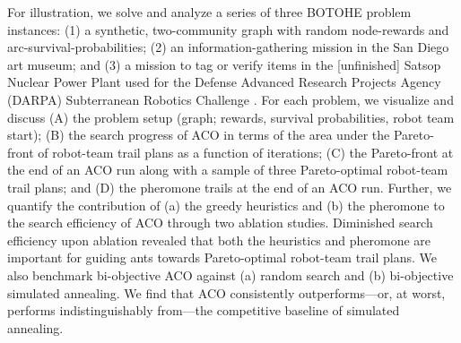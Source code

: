 \documentclass[fleqn,10pt,lineno]{wlpeerj}
\begin{document}
For illustration, we solve and analyze a series of three BOTOHE problem instances:
(1) a synthetic, two-community graph with random node-rewards and arc-survival-probabilities;
(2) an information-gathering mission in the San Diego art museum;
and
(3) a mission to tag or verify items in the [unfinished] Satsop Nuclear Power Plant used for the Defense Advanced Research Projects Agency (DARPA) Subterranean Robotics Challenge \cite{ackerman2022robots,orekhov2022darpa}.
For each problem, we visualize and discuss
(A) the problem setup (graph; rewards, survival probabilities, robot team start); 
(B) the search progress of ACO in terms of the area under the Pareto-front of robot-team trail plans as a function of iterations;
(C) the Pareto-front at the end of an ACO run along with a sample of three Pareto-optimal robot-team trail plans; and
(D) the pheromone trails at the end of an ACO run.
Further, we quantify the contribution of (a) the greedy heuristics and (b) the pheromone to the search efficiency of ACO through two ablation studies. Diminished search efficiency upon ablation revealed that both the heuristics and pheromone are important for guiding ants towards Pareto-optimal robot-team trail plans.
We also benchmark bi-objective ACO against (a) random search and (b) bi-objective simulated annealing.
We find that ACO consistently outperforms---or, at worst, performs indistinguishably from---the competitive baseline of simulated annealing.
\end{document}
